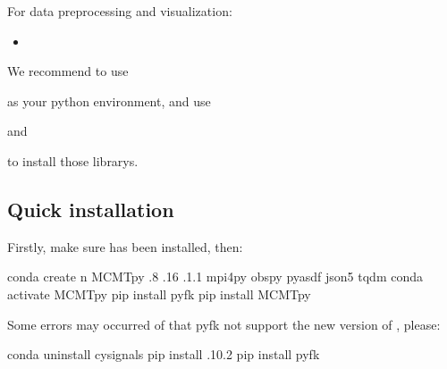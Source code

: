 \documentclass[a4paper,10pt,english,openany]{sphinxmanual}
\begin{document}
For data preprocessing and visualization:
\begin{itemize}
\item {} 
%
\begin{footnote}[3]\sphinxAtStartFootnote
{}
%
\end{footnote}

\end{itemize}

We recommend to use %
\begin{footnote}[4]\sphinxAtStartFootnote
{}
%
\end{footnote} as your python environment, and
use %
\begin{footnote}[5]\sphinxAtStartFootnote
{}
%
\end{footnote} and %
\begin{footnote}[6]\sphinxAtStartFootnote
{}
%
\end{footnote}
to install those librarys.


\subsection{Quick installation}
\label{\detokenize{installation:quick-installation}}
Firstly, make sure  has been installed, then:

\begin{sphinxVerbatim}[commandchars=\\\{\}]
\PYGZdl{} conda create \PYGZhy{}n MCMTpy  .8 .16 .1.1 mpi4py obspy pyasdf json5 tqdm
\PYGZdl{} conda activate MCMTpy
\PYGZdl{} pip install pyfk
\PYGZdl{} pip install MCMTpy
\end{sphinxVerbatim}

Some errors may occurred of that pyfk not support the new version of , please:

\begin{sphinxVerbatim}[commandchars=\\\{\}]
\PYGZdl{} conda uninstall cysignals
\PYGZdl{} pip install .10.2
\PYGZdl{} pip install pyfk
\end{sphinxVerbatim}
\end{document}
